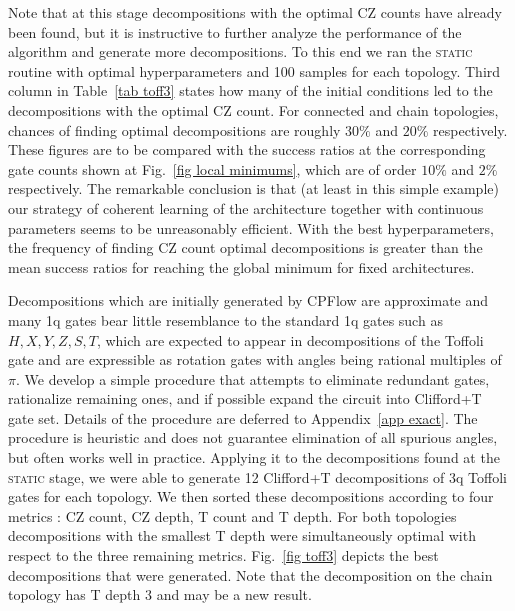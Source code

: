 \documentclass[twocolumn, amsfonts, amssymb, aps, nofootinbib]{revtex4-2}
\newcommand{\CZ}{\textsf{CZ }}
\newcommand{\T}{\textsf{T }}
\newcommand{\package}[1]{\textrm {#1 }}
\newcommand{\cpflow}{\package{CPFlow}}
\newcommand{\static}{\textsc{static }}
\begin{document}
Note that at this stage decompositions with the optimal \CZ counts have already been found, but it is instructive to further analyze the performance of the algorithm and generate more decompositions. To this end we ran the \static routine with optimal hyperparameters and 100 samples for each topology. Third column in Table~\ref{tab toff3} states how many of the initial conditions led to the decompositions with the optimal \CZ count. For connected and chain topologies, chances of finding optimal decompositions are roughly $30\%$ and $20\%$ respectively. These figures are to be compared with the success ratios at the corresponding gate counts shown at Fig.~\ref{fig local minimums}, which are of order $10\%$ and $2\%$ respectively. The remarkable conclusion is that (at least in this simple example) our strategy of coherent learning of the architecture together with continuous parameters seems to be unreasonably efficient. With the best hyperparameters, the frequency of finding \CZ count optimal decompositions is greater than the mean success ratios for reaching the global minimum for fixed architectures.

Decompositions which are initially generated by \cpflow are approximate and many 1q gates bear little resemblance to the standard 1q gates such as $H, X, Y, Z, S, T$, which are expected to appear in decompositions of the Toffoli gate and are expressible as rotation gates with angles being rational multiples of $\pi$. We develop a simple procedure that attempts to eliminate redundant gates, rationalize remaining ones, and if possible expand the circuit into Clifford+T gate set. Details of the procedure are deferred to Appendix~\ref{app exact}. The procedure is heuristic and does not guarantee elimination of all spurious angles, but often works well in practice. Applying it to the decompositions found at the \static stage, we were able to generate 12 Clifford+T decompositions of 3q Toffoli gates for each topology. We then sorted these decompositions according to four metrics : \CZ count, \CZ depth, \T count and \T depth. For both topologies decompositions with the smallest \T  depth were simultaneously optimal with respect to the three remaining metrics. Fig.~\ref{fig toff3} depicts the best decompositions that were generated. Note that the decomposition on the chain topology has \T depth 3 and may be a new result.
\end{document}
